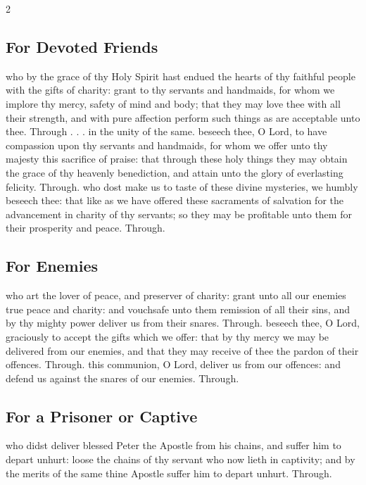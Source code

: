 \begin{multicols}{2}
   \newcolumn

\subsection{For Devoted Friends}
\collect
{} who by the grace of thy Holy Spirit hast endued the hearts of thy faithful people with the gifts of charity: grant to thy servants and handmaids, for whom we implore thy mercy, safety of mind and body; that they may love thee with all their strength, and with pure affection perform such things as are acceptable unto thee. Through . . . in the unity of the same.
\secret
{} beseech thee, O Lord, to have compassion upon thy servants and handmaids, for whom we offer unto thy majesty this sacrifice of praise: that through these holy things they may obtain the grace of thy heavenly benediction, and attain unto the glory of everlasting felicity. Through.
\postcommunion
{} who dost make us to taste of these divine mysteries, we humbly beseech thee: that like as we have offered these sacraments of salvation for the advancement in charity of thy servants; so they may be profitable unto them for their prosperity and peace. Through.

   \newcolumn

\subsection{For Enemies}
\collect
{} who art the lover of peace, and preserver of charity: grant unto all our enemies true peace and charity: and vouchsafe unto them remission of all their sins, and by thy mighty power deliver us from their snares. Through.
\secret
{} beseech thee, O Lord, graciously to accept the gifts which we offer: that by thy mercy we may be delivered from our enemies, and that they may receive of thee the pardon of their offences. Through.
\postcommunion
{} this communion, O Lord, deliver us from our offences: and defend us against the snares of our enemies. Through.

\subsection{For a Prisoner or Captive}
\collect
{} who didst deliver blessed Peter the Apostle from his chains, and suffer him to depart unhurt: loose the chains of thy servant who now lieth in captivity; and by the merits of the same thine Apostle suffer him to depart unhurt. Through.


\end{multicols}

